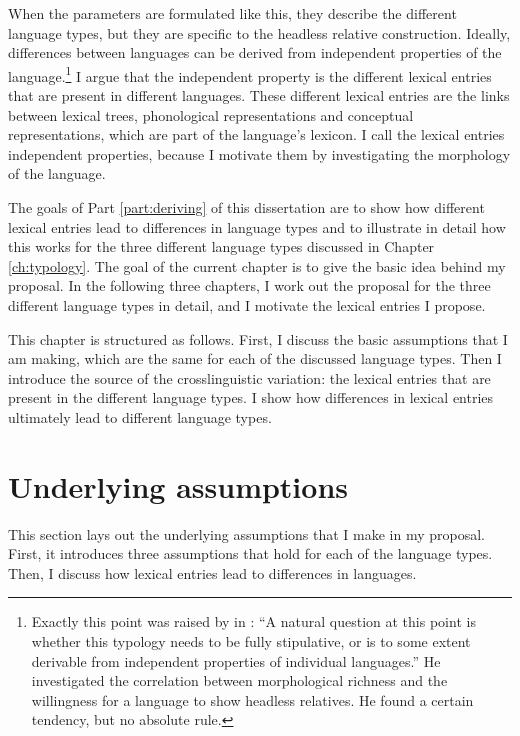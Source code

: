 When the parameters are formulated like this, they describe the different language types, but they are specific to the headless relative construction. Ideally, differences between languages can be derived from independent properties of the language.\footnote{
Exactly this point was raised by in \citet[][147]{grosu1994}:
``A natural question at this point is whether this typology needs to be fully stipulative, or is to some extent derivable from independent properties of individual languages.''
He investigated the correlation between morphological richness and the willingness for a language to show headless relatives. He found a certain tendency, but no absolute rule.
}
I argue that the independent property is the different lexical entries that are present in different languages. These different lexical entries are the links between lexical trees, phonological representations and conceptual representations, which are part of the language's lexicon.
I call the lexical entries independent properties, because I motivate them by investigating the morphology of the language.

The goals of Part \ref{part:deriving} of this dissertation are to show how different lexical entries lead to differences in language types and to illustrate in detail how this works for the three different language types discussed in Chapter \ref{ch:typology}. The goal of the current chapter is to give the basic idea behind my proposal. In the following three chapters, I work out the proposal for the three different language types in detail, and I motivate the lexical entries I propose.

This chapter is structured as follows.
First, I discuss the basic assumptions that I am making, which are the same for each of the discussed language types. Then I introduce the source of the crosslinguistic variation: the lexical entries that are present in the different language types. I show how differences in lexical entries ultimately lead to different language types.


\section{Underlying assumptions}\label{sec:assumptions}

This section lays out the underlying assumptions that I make in my proposal. First, it introduces three assumptions that hold for each of the language types. Then, I discuss how lexical entries lead to differences in languages.

